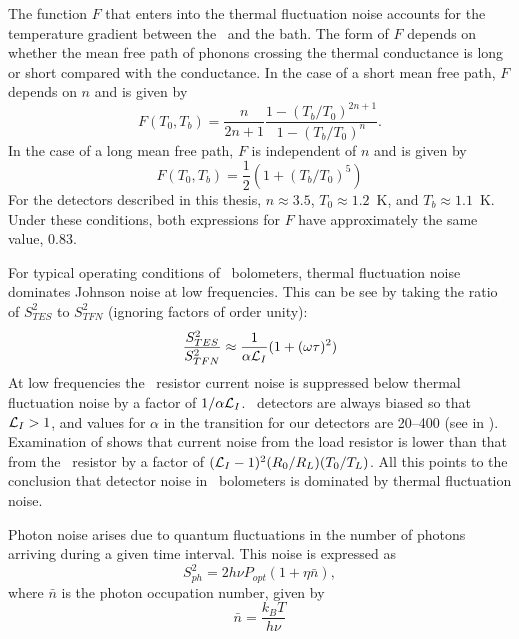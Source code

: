 The function $F$ that enters into the thermal fluctuation noise accounts for the temperature gradient between the \TES\ and the bath.
The form of $F$ depends on whether the mean free path of phonons crossing the thermal conductance is long or short compared with the conductance.
In the case of a short mean free path, $F$ depends on $n$ and is given by \cite{mather_bolometer_1982}
\begin{equation}
  F(T_0,T_b) = \frac{n}{2n+1} \frac{1 - (T_b/T_0)^{2n+1}}{1 - (T_b/T_0)^{n}}.
\end{equation}
In the case of a long mean free path, $F$ is independent of $n$ and is given by \cite{boyle_performance_1959}
\begin{equation}
  F(T_0, T_b) = \frac{1}{2} (1 + (T_b/T_0)^5)
\end{equation}
For the detectors described in this thesis, $n \approx 3.5$, $T_0 \approx 1.2$~K, and $T_b \approx 1.1$~K.
Under these conditions, both expressions for $F$ have approximately the same value, 0.83.

For typical operating conditions of \TES\ bolometers, thermal fluctuation noise dominates Johnson noise at low frequencies.
This can be see by taking the ratio of $S^2_{TES}$ to $S^2_{TFN}$ (ignoring factors of order unity):
\begin{equation}
\frac{S^2_{TES}}{S^2_{TFN}} \approx \frac{1}{\alpha \mathcal{L}_I} (1 + (\omega \tau)^2)
\end{equation}
At low frequencies the \TES\ resistor current noise is suppressed below thermal fluctuation noise by a factor of $1/\alpha \mathcal{L}_I$.
\TES\ detectors are always biased so that $\mathcal{L}_I > 1$, and values for $\alpha$ in the transition for our detectors are 20--400 (see  in ).
Examination of  shows that current noise from the load resistor is lower than that from the \TES\ resistor by a factor of $(\mathcal{L}_I-1)^2 (R_0 / R_L) (T_0/T_L)$.
All this points to the conclusion that detector noise in \TES\ bolometers is dominated by thermal fluctuation noise.

Photon noise arises due to quantum fluctuations in the number of photons arriving during a given time interval.
This noise is expressed as \cite{zmuidzinas_thermal_2003}
\begin{equation}\label{eqn:photon-noise}
  S^2_{ph} = 2 h \nu P_{opt} (1 + \eta \bar{n}),
\end{equation}
where $\bar{n}$ is the photon occupation number, given by
\begin{equation}
  \bar{n} = \frac{k_B T}{h \nu}
\end{equation}


